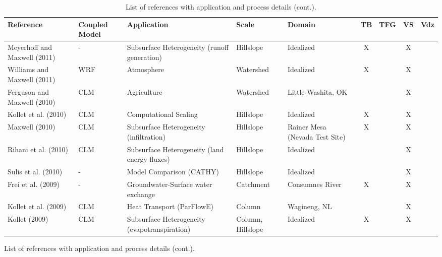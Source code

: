 {\begin{table} \center
\renewcommand{\arraystretch}{2.5}
\center

\caption{List of \parflow{} references with application and process details (cont.).}

\begin{tabular}{ l  p{1.5cm} p{2cm} p{1.5cm} p{1.5cm} | c | c | c | c }
\bf{Reference} & \bf{Coupled Model} & \bf{Application} & \bf{Scale} & \bf{Domain} & \bf{TB} & \bf{TFG} & \bf{VS} & \bf{Vdz} \\ 
\hline{}
   
\cite{Meyerhoff11} Meyerhoff and Maxwell (2011) & - & Subsurface Heterogeneity (runoff generation) & Hillslope  & Idealized  & X &   & X &     \\
\cite{Williams11} Williams and Maxwell (2011) & WRF & Atmosphere & Watershed & Idealized & X &   & X &     \\
\cite{FM10} Ferguson and Maxwell (2010) & CLM & Agriculture & Watershed & Little Washita, OK &   &   & X &     \\
\cite{KMWSVVS10} Kollet et al. (2010) & CLM & Computational Scaling & Hillslope & Idealized & X &   & X &     \\
\cite{M10} Maxwell (2010) & CLM & Subsurface Heterogeneity (infiltration) & Hillslope & Rainer Mesa (Nevada Test Site) & X &   & X &     \\
\cite{RMC10} Rihani et al. (2010) & CLM & Subsurface Heterogeneity (land energy fluxes) & Hillslope & Idealized  &   &   & X &     \\
\cite{SMPMPK10} Sulis et al. (2010) & - & Model Comparison (CATHY) & Hillslope & Idealized &   &   & X &     \\
\cite{FFKM09} Frei et al. (2009) & - & Groundwater-Surface water exchange & Catchment & Consumnes River & X &   & X &     \\
\cite{KCSMMB09} Kollet et al. (2009) & CLM & Heat Transport (ParFlowE) & Column & Wagineng, NL &   &   & X &     \\
\cite{K09} Kollet (2009) & CLM & Subsurface Heterogeneity (evapotranspiration) & Column, Hillslope & Idealized & X &   & X &     \\
\end{tabular}
\label{pfref5}
\end{table}

\begin{table} \center
\renewcommand{\arraystretch}{2.5}
\center

\caption{List of \parflow{} references with application and process details (cont.).}


\end{table}}
